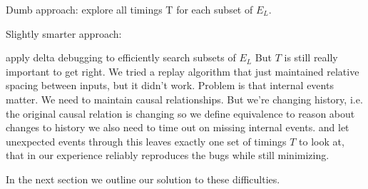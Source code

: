 Dumb approach: explore all timings T for each subset of $E_L$.

Slightly smarter approach:
\begin{outline}
  \1 apply delta debugging to efficiently search subsets of $E_L$
  \1 But $T$ is still really important to get right. We tried a replay algorithm that just maintained relative spacing between inputs, but it didn't work.
  \1 Problem is that internal events matter. We need to maintain causal relationships.
  \1 But we're  changing history, i.e. the original causal relation is changing
  \1 so we define equivalence to reason about changes to history
  \1 we also need to time out on missing internal events.
  \1 and let unexpected events through
  \1 this leaves exactly one set of timings $T$ to look at, that in our experience reliably reproduces the bugs while still minimizing.
\end{outline}

In the next section we outline our solution to these difficulties.


